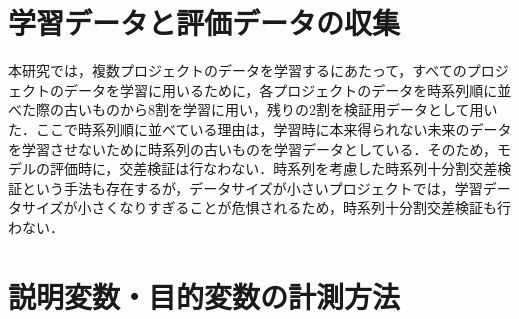 \documentclass[11pt,dvipdfmx]{jreport}
\begin{document}

\section{学習データと評価データの収集}

本研究では，複数プロジェクトのデータを学習するにあたって，すべてのプロジェクトのデータを学習に用いるために，各プロジェクトのデータを時系列順に並べた際の古いものから8割を学習に用い，残りの2割を検証用データとして用いた．ここで時系列順に並べている理由は，学習時に本来得られない未来のデータを学習させないために時系列の古いものを学習データとしている．そのため，モデルの評価時に，交差検証は行なわない．時系列を考慮した時系列十分割交差検証という手法も存在するが，データサイズが小さいプロジェクトでは，学習データサイズが小さくなりすぎることが危惧されるため，時系列十分割交差検証も行わない．





\section{説明変数・目的変数の計測方法}
\end{document}
